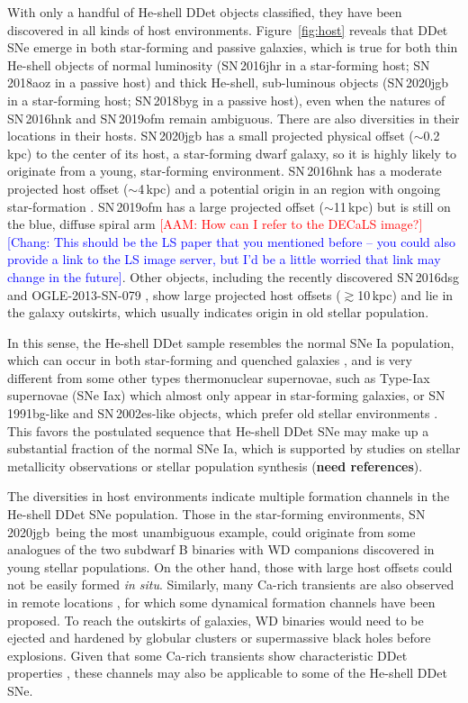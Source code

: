 \documentclass[twocolumn]{aastex631}
\newcommand{\sn}{SN\,2020jgb}
\newcommand{\adam}[1]{\textcolor{red}{[AAM: #1]}}
\newcommand{\chang}[1]{\textcolor{blue}{[Chang: #1]}}
\begin{document}
With only a handful of He-shell DDet objects classified, they have been discovered in all kinds of host environments. Figure~\ref{fig:host} reveals that DDet SNe emerge in both star-forming and passive galaxies, which is true for both thin He-shell objects of normal luminosity (SN\,2016jhr in a star-forming host; SN\,2018aoz in a passive host) and thick He-shell, sub-luminous objects (SN\,2020jgb in a star-forming host; SN\,2018byg in a passive host), even when the natures of SN\,2016hnk and SN\,2019ofm remain ambiguous. There are also diversities in their locations in their hosts. SN\,2020jgb has a small projected physical offset ($\sim$0.2\,kpc) to the center of its host, a star-forming dwarf galaxy, so it is highly likely to originate from a young, star-forming environment. SN\,2016hnk has a moderate projected host offset ($\sim$4\,kpc) and a potential origin in an  region with ongoing star-formation \citep{galbany_16hnk_2019}. SN\,2019ofm has a large projected offset ($\sim$11\,kpc) but is still on the blue, diffuse spiral arm \adam{How can I refer to the DECaLS image?} \chang{This should be the LS paper that you mentioned before -- you could also provide a link to the LS image server, but I'd be a little worried that link may change in the future}. Other objects, including the recently discovered SN\,2016dsg and OGLE-2013-SN-079 \citep{Dong_16dsg_2022}, show large projected host offsets ($\gtrsim$10\,kpc) and lie in the galaxy outskirts, which usually indicates origin in old stellar population.

In this sense, the He-shell DDet sample resembles the normal SNe Ia population, which can occur in both star-forming and quenched galaxies \citep[e.g.,][]{Sullivan_2006, Smith_2012}, and is very different from some other types thermonuclear supernovae, such as Type-Iax supernovae (SNe Iax) which almost only appear in star-forming galaxies, or SN\,1991bg-like and SN\,2002es-like objects, which prefer old stellar environments \citep[see the review in][]{Jha_2019}. This favors the postulated sequence that He-shell DDet SNe may make up a substantial fraction of the normal SNe Ia, which is supported by studies on stellar metallicity observations \citep{Sanders_2021, Eitner_2022} or stellar population synthesis (\textbf{need references}).

The diversities in host environments indicate multiple formation channels in the He-shell DDet SNe population. Those in the star-forming environments, \sn\ being the most unambiguous example, could originate from some analogues of the two subdwarf B binaries with WD companions \citep{Geier_2013, Kupfer_2022} discovered in young stellar populations.
On the other hand, those with large host offsets could not be easily formed {\it in situ}. Similarly, many Ca-rich transients are also observed in remote locations \citep{Lunnan_2017}, for which some dynamical formation channels have been proposed. To reach the outskirts of galaxies, WD binaries would need to be ejected and hardened by globular clusters \citep{Shen_2019} or supermassive black holes \citep{Foley_2015} before explosions. Given that some Ca-rich transients show characteristic DDet properties \citep{de_Ca_rich_2020}, these channels may also be applicable to some of the He-shell DDet SNe. 
\end{document}
